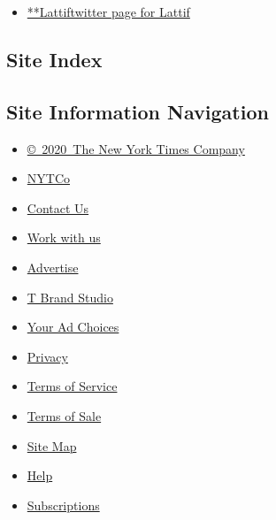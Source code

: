\begin{itemize}
\tightlist
\item
  \href{https://twitter.com/Lattif}{**Lattiftwitter page for Lattif}
\end{itemize}

\hypertarget{site-index}{%
\subsection{Site Index}\label{site-index}}

\hypertarget{site-information-navigation}{%
\subsection{Site Information
Navigation}\label{site-information-navigation}}

\begin{itemize}
\tightlist
\item
  \href{https://help.nytimes.com/hc/en-us/articles/115014792127-Copyright-notice}{©~2020~The
  New York Times Company}
\end{itemize}

\begin{itemize}
\tightlist
\item
  \href{https://www.nytco.com/}{NYTCo}
\item
  \href{https://help.nytimes.com/hc/en-us/articles/115015385887-Contact-Us}{Contact
  Us}
\item
  \href{https://www.nytco.com/careers/}{Work with us}
\item
  \href{https://nytmediakit.com/}{Advertise}
\item
  \href{http://www.tbrandstudio.com/}{T Brand Studio}
\item
  \href{https://www.nytimes.com/privacy/cookie-policy\#how-do-i-manage-trackers}{Your
  Ad Choices}
\item
  \href{https://www.nytimes.com/privacy}{Privacy}
\item
  \href{https://help.nytimes.com/hc/en-us/articles/115014893428-Terms-of-service}{Terms
  of Service}
\item
  \href{https://help.nytimes.com/hc/en-us/articles/115014893968-Terms-of-sale}{Terms
  of Sale}
\item
  \href{https://spiderbites.nytimes.com}{Site Map}
\item
  \href{https://help.nytimes.com/hc/en-us}{Help}
\item
  \href{https://www.nytimes.com/subscription?campaignId=37WXW}{Subscriptions}
\end{itemize}
